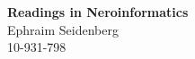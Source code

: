 \documentclass[11pt, english]{article}
\begin{document}
\begin{center}


	\Large{%
	\bfseries Readings in Neroinformatics} \\[1cm] 



	\Large{ Ephraim Seidenberg}\\[0.1cm]
	10-931-798\\[0.1cm]
	
	\vfill

\end{center}

\vspace{1cm}



\nocite{hodgkin1952quantitative}
\end{document}
